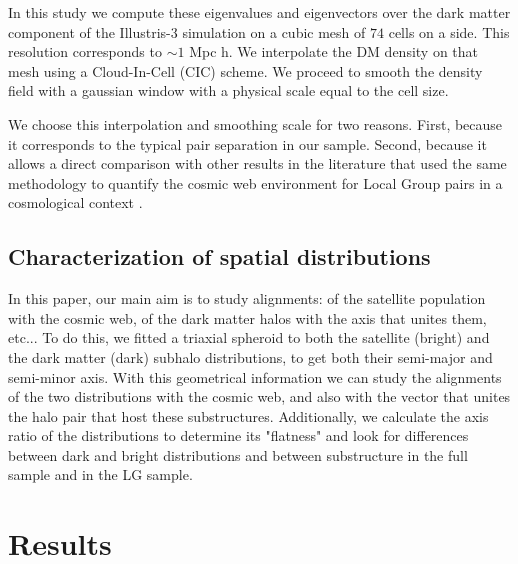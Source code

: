 \documentclass{emulateapj}
\begin{document}
In this study we compute these eigenvalues and eigenvectors over the
dark matter component of the Illustris-3 simulation on a cubic mesh of
$74$ cells on a side. 
This resolution corresponds to $\sim 1$ Mpc h.
We interpolate the DM density on that mesh using a Cloud-In-Cell (CIC)
scheme. 
We proceed to smooth the density field with a gaussian window with a
physical scale equal to the cell size. 

We choose this interpolation and smoothing scale for two reasons.
First, because it corresponds to the typical pair separation in our
sample.
Second, because it allows a direct comparison with other results in
the literature that used the same methodology to quantify the cosmic
web environment for Local Group pairs in a cosmological context
\citep{ForeroRomero2013,2015ApJ...799...45F}.  

\subsection{Characterization of spatial distributions}
\label{Method}
In this paper, our main aim is to study alignments: of the
satellite population with the cosmic web, of the dark matter halos
with the axis that unites them, etc... 
To do this, we fitted a triaxial spheroid to both the satellite (bright) and the dark matter (dark) subhalo distributions, to get both their semi-major and semi-minor axis. 
With this geometrical information we can study the alignments of the two distributions with the cosmic web, and also with the vector that unites the halo pair that host these substructures.
Additionally, we calculate the axis ratio of the distributions to determine its "flatness" and look for differences between dark and bright distributions and between substructure in the full sample and in the LG sample.

\section{Results}
\label{Results}
\end{document}
